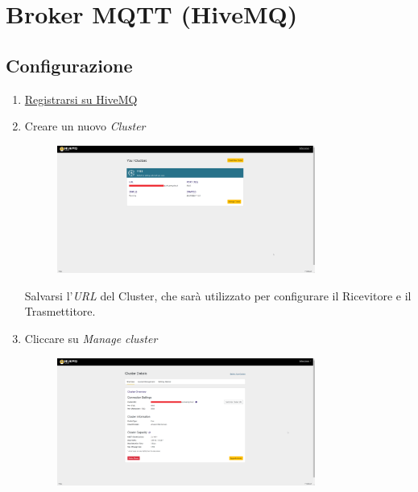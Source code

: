 \documentclass[a4paper,11pt]{article}
\begin{document}
\section{Broker MQTT (HiveMQ)}
\label{sec:Broker}

  \subsection{Configurazione}

    \begin{enumerate}
      \item \href{https://console.hivemq.cloud/}{Registrarsi su HiveMQ}
      \item Creare un nuovo \emph{Cluster}
        \begin{figure}[H]
          \centering
          \includegraphics[width=0.8\textwidth,height=\textheight,keepaspectratio]{assets/hivemq_clusters}
        \end{figure}

        Salvarsi l'\emph{URL} del Cluster, che sarà utilizzato per configurare il Ricevitore e il Trasmettitore.

      \item Cliccare su \emph{Manage cluster}
        \begin{figure}[H]
          \centering
          \includegraphics[width=0.8\textwidth,height=\textheight,keepaspectratio]{assets/hivemq_clusterdetails}
        \end{figure}


\end{enumerate}
\end{document}
